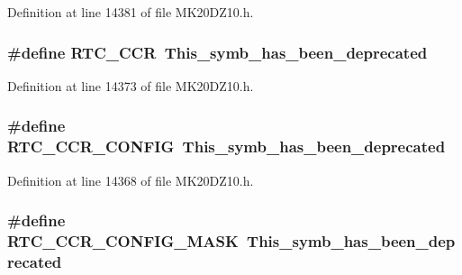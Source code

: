 Definition at line 14381 of file M\+K20\+D\+Z10.\+h.

\subsubsection[{\texorpdfstring{R\+T\+C\+\_\+\+C\+CR}{RTC_CCR}}]{\setlength{\rightskip}{0pt plus 5cm}\#define R\+T\+C\+\_\+\+C\+CR~This\+\_\+symb\+\_\+has\+\_\+been\+\_\+deprecated}\hypertarget{group___backward___compatibility___symbols_ga5aa0f9eb9a40d760e4123632e169b4b2}{}\label{group___backward___compatibility___symbols_ga5aa0f9eb9a40d760e4123632e169b4b2}


Definition at line 14373 of file M\+K20\+D\+Z10.\+h.

\subsubsection[{\texorpdfstring{R\+T\+C\+\_\+\+C\+C\+R\+\_\+\+C\+O\+N\+F\+IG}{RTC_CCR_CONFIG}}]{\setlength{\rightskip}{0pt plus 5cm}\#define R\+T\+C\+\_\+\+C\+C\+R\+\_\+\+C\+O\+N\+F\+IG~This\+\_\+symb\+\_\+has\+\_\+been\+\_\+deprecated}\hypertarget{group___backward___compatibility___symbols_gacbb11b1e90585e921482f390c741fcc7}{}\label{group___backward___compatibility___symbols_gacbb11b1e90585e921482f390c741fcc7}


Definition at line 14368 of file M\+K20\+D\+Z10.\+h.

\subsubsection[{\texorpdfstring{R\+T\+C\+\_\+\+C\+C\+R\+\_\+\+C\+O\+N\+F\+I\+G\+\_\+\+M\+A\+SK}{RTC_CCR_CONFIG_MASK}}]{\setlength{\rightskip}{0pt plus 5cm}\#define R\+T\+C\+\_\+\+C\+C\+R\+\_\+\+C\+O\+N\+F\+I\+G\+\_\+\+M\+A\+SK~This\+\_\+symb\+\_\+has\+\_\+been\+\_\+deprecated}\hypertarget{group___backward___compatibility___symbols_ga2af2c9c33277b23542c55ad751de1c53}{}\label{group___backward___compatibility___symbols_ga2af2c9c33277b23542c55ad751de1c53}


